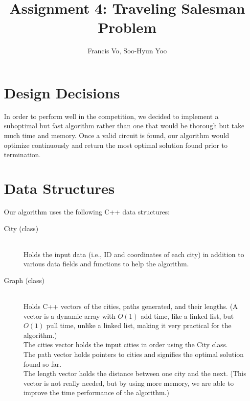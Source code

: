 \documentclass[letterpaper,11pt]{article}
\title{Assignment 4: Traveling Salesman Problem}
\author{Francis Vo, Soo-Hyun Yoo}
\begin{document}
\maketitle

	\section{Design Decisions}
		In order to perform well in the competition, we decided to implement
		a suboptimal but fast algorithm rather than one that would be thorough
		but take much time and memory. Once a valid circuit is found, our
		algorithm would optimize continuously and return the most optimal
		solution found prior to termination.


	\section{Data Structures}
		Our algorithm uses the following C++ data structures:
		\begin{description}
			\item[City (class)] \hfill \\
				Holds the input data (i.e., ID and coordinates of each city) in
				addition to various data fields and functions to help the
				algorithm.
			\item[Graph (class)] \hfill \\
				Holds C++ vectors of the cities, paths generated, and their
				lengths. (A vector is a dynamic array with $O(1)$ add time,
				like a linked list, but $O(1)$ pull time, unlike a linked list,
				making it very practical for the algorithm.) \\
				The cities vector holds the input cities in order using the
				City class. \\
				The path vector holds pointers to cities and signifies the
				optimal solution found so far. \\
				The length vector holds the distance between one city and the
				next. (This vector is not really needed, but by using more
				memory, we are able to improve the time performance of the
				algorithm.)
		\end{description}
\end{document}
